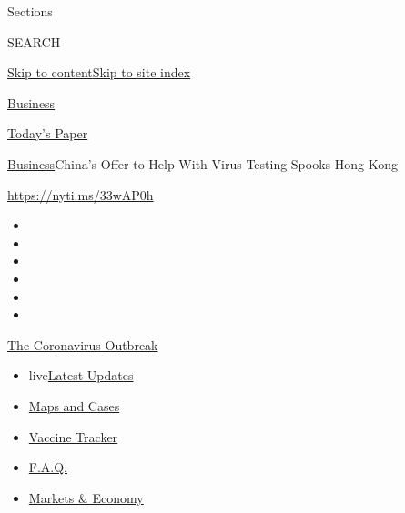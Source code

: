 Sections

SEARCH

\protect\hyperlink{site-content}{Skip to
content}\protect\hyperlink{site-index}{Skip to site index}

\href{https://www.nytimes.com/section/business}{Business}

\href{https://myaccount.nytimes.com/auth/login?response_type=cookie\&client_id=vi}{}

\href{https://www.nytimes.com/section/todayspaper}{Today's Paper}

\href{/section/business}{Business}\textbar{}China's Offer to Help With
Virus Testing Spooks Hong Kong

\href{https://nyti.ms/33wAP0h}{https://nyti.ms/33wAP0h}

\begin{itemize}
\item
\item
\item
\item
\item
\item
\end{itemize}

\href{https://www.nytimes.com/news-event/coronavirus?action=click\&pgtype=Article\&state=default\&region=TOP_BANNER\&context=storylines_menu}{The
Coronavirus Outbreak}

\begin{itemize}
\tightlist
\item
  live\href{https://www.nytimes.com/2020/08/08/world/coronavirus-updates.html?action=click\&pgtype=Article\&state=default\&region=TOP_BANNER\&context=storylines_menu}{Latest
  Updates}
\item
  \href{https://www.nytimes.com/interactive/2020/us/coronavirus-us-cases.html?action=click\&pgtype=Article\&state=default\&region=TOP_BANNER\&context=storylines_menu}{Maps
  and Cases}
\item
  \href{https://www.nytimes.com/interactive/2020/science/coronavirus-vaccine-tracker.html?action=click\&pgtype=Article\&state=default\&region=TOP_BANNER\&context=storylines_menu}{Vaccine
  Tracker}
\item
  \href{https://www.nytimes.com/interactive/2020/world/coronavirus-tips-advice.html?action=click\&pgtype=Article\&state=default\&region=TOP_BANNER\&context=storylines_menu}{F.A.Q.}
\item
  \href{https://www.nytimes.com/live/2020/08/07/business/stock-market-today-coronavirus?action=click\&pgtype=Article\&state=default\&region=TOP_BANNER\&context=storylines_menu}{Markets
  \& Economy}
\end{itemize}

